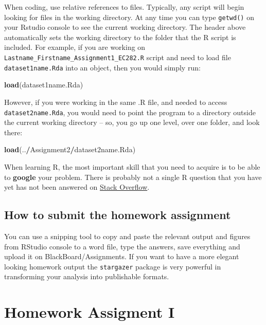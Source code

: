 \documentclass[]{book}
\newenvironment{Shaded}{\begin{snugshade}}{\end{snugshade}}
\newcommand{\KeywordTok}[1]{\textcolor[rgb]{0.13,0.29,0.53}{\textbf{#1}}}
\newcommand{\OperatorTok}[1]{\textcolor[rgb]{0.81,0.36,0.00}{\textbf{#1}}}
\newcommand{\NormalTok}[1]{#1}
\begin{document}
When coding, use relative references to files. Typically, any script
will begin looking for files in the working directory. At any time you
can type \texttt{getwd()} on your Rstudio console to see the current
working directory. The header above automatically sets the working
directory to the folder that the R script is included. For example, if
you are working on \texttt{Lastname\_Firstname\_Assignment1\_EC282.R}
script and need to load file \texttt{dataset1name.Rda} into an object,
then you would simply run:

\begin{Shaded}
\begin{Highlighting}[]
\KeywordTok{load}\NormalTok{(dataset1name.Rda)}
\end{Highlighting}
\end{Shaded}

However, if you were working in the same .R file, and needed to access
\texttt{dataset2name.Rda}, you would need to point the program to a
directory outside the current working directory -- so, you go up one
level, over one folder, and look there:

\begin{Shaded}
\begin{Highlighting}[]
\KeywordTok{load}\NormalTok{(..}\OperatorTok{/}\NormalTok{Assignment2}\OperatorTok{/}\NormalTok{dataset2name.Rda)}
\end{Highlighting}
\end{Shaded}

When learning R, the most important skill that you need to acquire is to
be able to \textbf{google} your problem. There is probably not a single
R question that you have yet has not been answered on
\href{https://stackoverflow.com/}{Stack Overflow}.

\section{How to submit the homework
assignment}\label{how-to-submit-the-homework-assignment}

You can use a snipping tool to copy and paste the relevant output and
figures from RStudio console to a word file, type the answers, save
everything and upload it on BlackBoard/Assignments. If you want to have
a more elegant looking homework output the \texttt{stargazer} package is
very powerful in transforming your analysis into publishable formats.

\chapter{Homework Assigment I}\label{homework-assigment-i}
\end{document}
